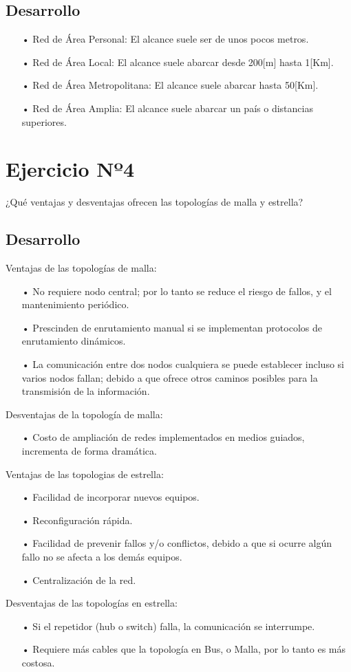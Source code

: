 \documentclass[12pt,letterpaper]{article}
\begin{document}
\subsection{Desarrollo}
\begin{enumerate}
\item[•]Red de Área Personal: El alcance suele ser de unos pocos metros.
\item[•]Red de Área Local: El alcance suele abarcar desde 200[m] hasta 1[Km].
\item[•]Red de Área Metropolitana: El alcance suele abarcar hasta 50[Km].
\item[•]Red de Área Amplia: El alcance suele abarcar un país o distancias superiores.
\end{enumerate}
\section{Ejercicio Nº4}
¿Qué ventajas y desventajas ofrecen las topologías de malla y estrella?
\subsection{Desarrollo}
Ventajas de las topologías de malla:
\begin{enumerate}
\item[•]No requiere nodo central; por lo tanto se reduce el riesgo de fallos, y el mantenimiento periódico.
\item[•]Prescinden de enrutamiento manual si se implementan protocolos de enrutamiento dinámicos.
\item[•]La comunicación entre dos nodos cualquiera se puede establecer incluso si varios nodos fallan; debido a que ofrece otros caminos posibles para la transmisión de la información.
\end{enumerate}
Desventajas de la topología de malla:
\begin{enumerate}
\item[•]Costo de ampliación de redes implementados en medios guiados, incrementa de forma dramática.
\end{enumerate}
Ventajas de las topologias de estrella:
\begin{enumerate}
\item[•]Facilidad de incorporar nuevos equipos.
\item[•]Reconfiguración rápida.
\item[•]Facilidad de prevenir fallos y/o conflictos, debido a que si ocurre algún fallo no se afecta a los demás equipos.
\item[•]Centralización de la red.
\end{enumerate}
Desventajas de las topologías en estrella:
\begin{enumerate}
\item[•]Si el repetidor (hub o switch) falla, la comunicación se interrumpe.
\item[•]Requiere más cables que la topología en Bus, o Malla, por lo tanto es más costosa.
\end{enumerate}
\end{document}

